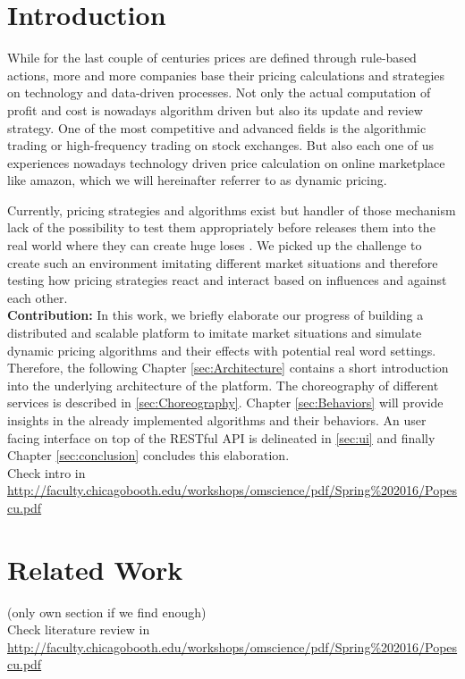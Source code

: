 \section{Introduction}
%
While for the last couple of centuries prices are defined through rule-based actions, more and more companies base their pricing calculations and strategies on technology and data-driven processes. Not only the actual computation of profit and cost is nowadays algorithm driven but also its update and review strategy.
One of the most competitive and advanced fields is the algorithmic trading or high-frequency trading on stock exchanges. But also each one of us experiences nowadays technology driven price calculation on online marketplace like amazon, which we will hereinafter referrer to as dynamic pricing. 

Currently, pricing strategies and algorithms exist but handler of those mechanism lack of the possibility to test them appropriately before releases them into the real world where they can create huge loses \citep{uflacker2016ertragsmanagement} \citep{schlosser2016optimal} \citep{schlosser2016stochastic} \citep{schlosser2016survive}. We picked up the challenge to create such an environment imitating different market situations and therefore testing how pricing strategies react and interact based on influences and against each other.\\

\textbf{Contribution:} In this work, we briefly elaborate our progress of building a distributed and scalable platform to imitate market situations and simulate dynamic pricing algorithms and their effects with potential real word settings.
Therefore, the following Chapter \ref{sec:Architecture} contains a short introduction into the underlying architecture of the platform.
The choreography of different services is described in \ref{sec:Choreography}. Chapter \ref{sec:Behaviors} will provide insights in the already implemented algorithms and their behaviors.
An user facing interface on top of the RESTful API is delineated in \ref{sec:ui} and finally Chapter \ref{sec:conclusion} concludes this elaboration. \\

Check intro in \url{http://faculty.chicagobooth.edu/workshops/omscience/pdf/Spring%202016/Popescu.pdf}

\section{Related Work}
(only own section if we find enough) \\

Check literature review in \url{http://faculty.chicagobooth.edu/workshops/omscience/pdf/Spring%202016/Popescu.pdf}